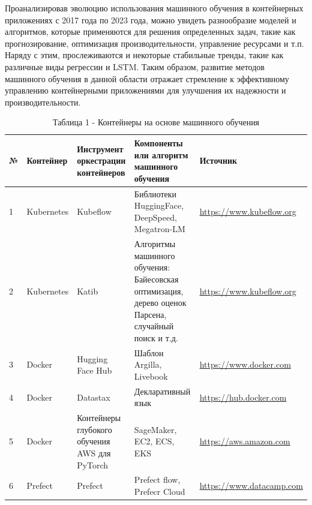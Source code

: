 \begin{multicols}{2}
Проанализировав эволюцию использования машинного обучения в контейнерных
приложениях с 2017 года по 2023 года, можно увидеть разнообразие моделей
и алгоритмов, которые применяются для решения определенных задач, такие
как прогнозирование, оптимизация производительности, управление
ресурсами и т.п. Наряду с этим, прослеживаются и некоторые стабильные
тренды, такие как различные виды регрессии и LSTM. Таким образом,
развитие методов машинного обучения в данной области отражает стремление
к эффективному управлению контейнерными приложениями для улучшения их
надежности и производительности.
\end{multicols}

\begin{table}[H]
\caption*{Таблица 1 - Контейнеры на основе машинного обучения}
\centering
\begin{tabular}{|l|p{}|p{}|p{}|p{}|}
\hline
№ & Контейнер & Инструмент оркестрации контейнеров & Компоненты или алгоритм машинного обучения & Источник \\ \hline
1 & Kubernetes & Kubeflow & Библиотеки HuggingFace, DeepSpeed, Megatron-LM & \href{https://www.kubeflow.org/docs/components/training/overview/}{https://www.kubeflow.org} \\ \hline
2 & Kubernetes & Katib & Алгоритмы машинного обучения: Байесовская оптимизация, дерево оценок Парсена, случайный поиск и т.д. & \href{https://www.kubeflow.org/docs/components/katib/overview}{https://www.kubeflow.org} \\ \hline
3 & Docker & Hugging Face Hub & Шаблон Argilla, Livebook & \href{https://www.docker.com/blog/build-machine-learning-apps-with-hugging-faces-docker-spaces/}{https://www.docker.com} \\ \hline
4 & Docker & Datastax & Декларативный язык & \href{https://hub.docker.com/u/datastax?\_gl=1*sbe5u0*\_ga*OTU0NDcxNDk2LjE3MTUzMjQyNzE.*\_ga\_XJWPQMJYHQ*MTcxNTMyNDI3MC4xLjEuMTcxNTMyNDczMC4zOC4wLjA.}{https://hub.docker.com} \\ \hline
5 & Docker & Контейнеры глубокого обучения AWS для PyTorch & SageMaker, EC2, ECS, EKS & \href{https://aws.amazon.com/marketplace/pp/prodview-sdoecebva2lui?sr=0-7\&ref\_=beagle\&applicationId=AWSMPContessa}{https://aws.amazon.com} \\ \hline
6 & Prefect & Prefect & Prefect flow, Prefecr Cloud & \href{https://www.datacamp.com/tutorial/ml-workflow-orchestration-with-prefect}{https://www.datacamp.com} \\ \hline

\end{tabular}
\end{table}
